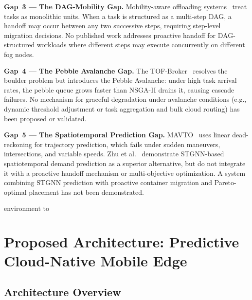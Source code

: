 \documentclass[12pt,a4paper]{article}
\begin{document}
\medskip\noindent\textbf{Gap~3 — The DAG-Mobility Gap.}
Mobility-aware offloading systems~\cite{mavto2024,paper5_mobility} treat tasks
as monolithic units. When a task is structured as a multi-step DAG, a handoff
may occur between any two successive steps, requiring step-level migration
decisions. No published work addresses proactive handoff for DAG-structured
workloads where different steps may execute concurrently on different fog nodes.


\medskip\noindent\textbf{Gap~4 — The Pebble Avalanche Gap.}
The TOF-Broker~\cite{nouri2024tof} resolves the boulder problem but introduces
the Pebble Avalanche: under high task arrival rates, the pebble queue grows
faster than NSGA-II drains it, causing cascade failures. No mechanism for
graceful degradation under avalanche conditions (e.g., dynamic threshold
adjustment or task aggregation and bulk cloud routing) has been proposed or
validated.


\medskip\noindent\textbf{Gap~5 — The Spatiotemporal Prediction Gap.}
MAVTO~\cite{mavto2024} uses linear dead-reckoning for trajectory prediction,
which fails under sudden maneuvers, intersections, and variable speeds. Zhu
et al.~\cite{zhu2025spatiotemporal} demonstrate STGNN-based spatiotemporal
demand prediction as a superior alternative, but do not integrate it with a
proactive handoff mechanism or multi-objective optimization. A system combining
STGNN prediction with proactive container migration and Pareto-optimal placement
has not been demonstrated.


 environment to



\section{Proposed Architecture: Predictive Cloud-Native Mobile Edge}
\label{sec:proposed}

\subsection{Architecture Overview}
\end{document}
